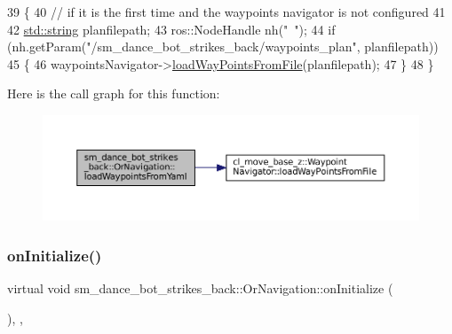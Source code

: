\begin{DoxyCode}
39     \{
40         \textcolor{comment}{// if it is the first time and the waypoints navigator is not configured}
41 
42         \hyperlink{namespacetesting_1_1internal_a8e8ff5b11e64078831112677156cb111}{std::string} planfilepath;
43         ros::NodeHandle nh(\textcolor{stringliteral}{"~"});
44         \textcolor{keywordflow}{if} (nh.getParam(\textcolor{stringliteral}{"/sm\_dance\_bot\_strikes\_back/waypoints\_plan"}, planfilepath))
45         \{
46             waypointsNavigator->\hyperlink{classcl__move__base__z_1_1WaypointNavigator_a18d74467ddf0e637a8d5a6e1fa2e93db}{loadWayPointsFromFile}(planfilepath);
47         \}
48     \}
\end{DoxyCode}
Here is the call graph for this function\+:
\nopagebreak
\begin{figure}[H]
\begin{center}
\leavevmode
\includegraphics[width=350pt]{classsm__dance__bot__strikes__back_1_1OrNavigation_abd8811831075be61ad28fe4a68fc738d_cgraph}
\end{center}
\end{figure}
\mbox{\label{classsm__dance__bot__strikes__back_1_1OrNavigation_a458a0c5fed04b9906c6943f1e7ac5bf0}} 
\subsubsection{\texorpdfstring{on\+Initialize()}{onInitialize()}}
{\footnotesize\ttfamily virtual void sm\+\_\+dance\+\_\+bot\+\_\+strikes\+\_\+back\+::\+Or\+Navigation\+::on\+Initialize (\begin{DoxyParamCaption}{ }\end{DoxyParamCaption})\hspace{0.3cm}{\ttfamily [inline]}, {\ttfamily [override]}, {\ttfamily [virtual]}}



